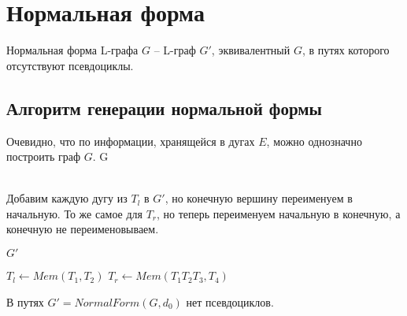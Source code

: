 \section{Нормальная форма}

\begin{definition}
    Нормальная форма L-графа $G$ -- L-граф $G'$, эквивалентный $G$, в путях которого отсутствуют псевдоциклы.
\end{definition}

\subsection*{Алгоритм генерации нормальной формы}
\begin{algorithmic}
        \State Очевидно, что по информации, хранящейся в дугах $E$, можно однозначно построить граф $G$.
        \State \Return G
    \EndFunction
    
    \\
        \State Добавим каждую дугу из $T_l$ в $G'$, но конечную вершину переименуем в начальную.
        \State То же самое для $T_r$, но теперь переименуем начальную в конечную, а конечную не переименовываем.

        \State \Return $G'$
    \EndFunction
    \\

                \State $T_l \gets Mem(T_1, T_2)$
                \State $T_r \gets Mem(T_1 T_2 T_3, T_4)$
                \EndIf
            \EndFor
        \EndFor

        \State {}
    \EndFunction
\end{algorithmic}

\begin{theorem}
    В путях $G' = NormalForm(G, d_0)$ нет псевдоциклов.
\end{theorem}

